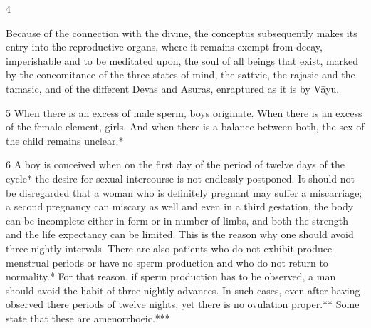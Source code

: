 \begin{translation}
\begin{tt}
    \raggedright


\item[4]



Because of the connection 
with the divine, the conceptus subsequently makes its entry into the reproductive 
organs, where it remains exempt from decay, imperishable and to be meditated 
upon, the soul of all beings that exist, marked by the concomitance of the three 
states-of-mind, the sattvic, the rajasic and the tamasic, and of the different 
Devas and Asuras, enraptured as it is by Vāyu.

\item[5]When there is an excess of male sperm, boys originate. When there is an 
excess of the female element, girls. And when there is a balance between both, 
the sex of the child remains unclear.*

\item[6]A boy is conceived when on the first day of the period of twelve days of 
the cycle* the desire for sexual intercourse is not endlessly postponed. It should 
not be disregarded that a woman who is definitely pregnant may  suffer a 
miscarriage; a second pregnancy can miscary as well and even in a third 
gestation, the body can be incomplete either in form or in number of limbs, and 
both the strength and the life expectancy can be limited. This is the reason why 
one should avoid three-nightly intervals. There are also patients who do not 
exhibit produce menstrual periods or have no sperm production and who do not 
return to normality.* For that reason, if sperm production has to be observed, a 
man should avoid the habit of three-nightly advances. In such cases, even after 
having observed there periods of twelve nights, yet there is no ovulation 
proper.** Some state that these are amenorrhoeic.*** 


\end{tt}
\end{translation}
